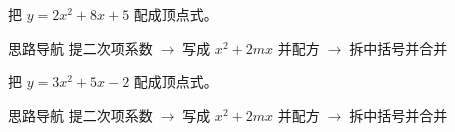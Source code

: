 \documentclass{exam-zh}
\begin{document}
\clearpage

\begin{eduProblemBlock}[例题 2 · 首项系数不为 1]
把 $y=2x^2+8x+5$ 配成顶点式。
\end{eduProblemBlock}





\begin{eduAuxItem}{思路导航}
提二次项系数$\;\to\;$写成 $x^2+2mx$ 并配方$\;\to\;$拆中括号并合并\end{eduAuxItem}





\begin{eduDualExplain}
  \begin{eduExplainLeft}
  \end{eduExplainLeft}

  \begin{eduExplainRight}
  \end{eduExplainRight}
\end{eduDualExplain}




\begin{eduProblemBlock}[例题 3 · $b/a$ 不是偶数]
把 $y=3x^2+5x-2$ 配成顶点式。
\end{eduProblemBlock}





\begin{eduAuxItem}{思路导航}
提二次项系数$\;\to\;$写成 $x^2+2mx$ 并配方$\;\to\;$拆中括号并合并\end{eduAuxItem}





\begin{eduDualExplain}
  \begin{eduExplainLeft}
  \end{eduExplainLeft}

  \begin{eduExplainRight}
  \end{eduExplainRight}
\end{eduDualExplain}
\end{document}
